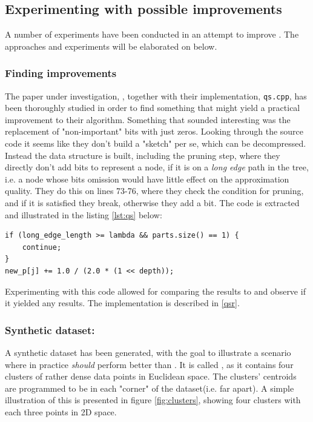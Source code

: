 \subsection{Experimenting with possible improvements}
\label{possible_improvements}
A number of experiments have been conducted in an attempt to improve \qs{}. The approaches and experiments will be elaborated on below.

\subsubsection{Finding improvements}
\label{finding_improvements}
The paper under investigation, \cite{wagner17}, together with their implementation, \texttt{qs.cpp}, has been thoroughly studied in order to find something that might yield a practical improvement to their algorithm. Something that sounded interesting was the replacement of "non-important" bits with just zeros. Looking through the source code it seems like they don't build a "sketch" per se, which can be decompressed. Instead the \qt{} data structure is built, including the pruning step, where they directly don't add bits to represent a node, if it is on a \textit{long edge} path in the tree, i.e. a node whose bits omission would have little effect on the approximation quality\cite[p. 3, l. 14]{wagner17}. They do this on lines 73-76, where they check the condition for pruning, and if it is satisfied they break, otherwise they add a bit. The code is extracted and illustrated in the listing \ref{lst:qs} below:

\begin{lstlisting}[caption={Pruning},label={lst:qs}]
if (long_edge_length >= lambda && parts.size() == 1) {
	continue;
}
new_p[j] += 1.0 / (2.0 * (1 << depth));
\end{lstlisting}

Experimenting with this code allowed for comparing the results to \qs{} and observe if it yielded any results. The implementation is described in \ref{qsr}.


\subsubsection{Synthetic dataset: \clust{}}
\label{clusters}
A synthetic dataset has been generated, with the goal to illustrate a scenario where \qsr{} in practice \textit{should} perform better than \qs{}. It is called \clust{}, as it contains four clusters of rather dense data points in Euclidean space. The clusters' centroids are programmed to be in each "corner" of the dataset(i.e. far apart). A simple illustration of this is presented in figure \ref{fig:clusters}, showing four clusters with each three points in 2D space.


